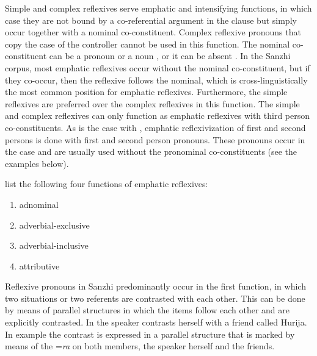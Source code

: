 Simple and complex  reflexives serve emphatic and intensifying functions, in which case they are not bound by a co-referential argument in the clause but simply occur together with a nominal co-constituent. Complex reflexive pronouns that copy the case of the controller cannot be used in this function. The nominal co-constituent can be a pronoun  or a noun , or it can be absent . In the Sanzhi corpus, most emphatic reflexives occur without the nominal co-constituent, but if they co-occur, then the reflexive follows the nominal, which is cross-linguistically the most common position for emphatic reflexives. Furthermore, the simple reflexives are preferred over the complex reflexives in this function. The simple and complex  reflexives can only function as emphatic reflexives with third person co-constituents. As is the case with , emphatic reflexivization of first and second persons is done with first and second person pronouns. These pronouns occur in the  case and are usually used without the pronominal co-constituents (see the examples below).

\citet{König.Gast2006} list the following four functions of emphatic reflexives:

\begin{enumerate}
	\item	adnominal 
	\item	adverbial-exclusive  
	\item	adverbial-inclusive  
	\item	attributive 
\end{enumerate}

Reflexive pronouns in Sanzhi predominantly occur in the first function, in which two situations or two referents are contrasted with each other. This can be done by means of parallel structures in which the items follow each other and are explicitly contrasted. In  the speaker contrasts herself with a friend called Hurija. In example  the contrast is expressed in a parallel structure that is marked by means of the  =\textit{ra} on both members, the speaker herself and the friends.

